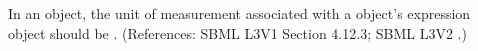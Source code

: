 In an \Event object, the unit of measurement associated with a \Priority
object's  expression object should be .  (References:
SBML L3V1 Section 4.12.3; SBML L3V2 .)
